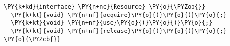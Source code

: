 \begin{Verbatim}[commandchars=\\\{\}]
\PY{k+kd}{interface} \PY{n+nc}{Resource} \PY{o}{\PYZob{}}
  \PY{k+kt}{void} \PY{n+nf}{acquire}\PY{o}{(}\PY{o}{)}\PY{o}{;}
  \PY{k+kt}{void} \PY{n+nf}{use}\PY{o}{(}\PY{o}{)}\PY{o}{;}
  \PY{k+kt}{void} \PY{n+nf}{release}\PY{o}{(}\PY{o}{)}\PY{o}{;}
\PY{o}{\PYZcb{}}
\end{Verbatim}
